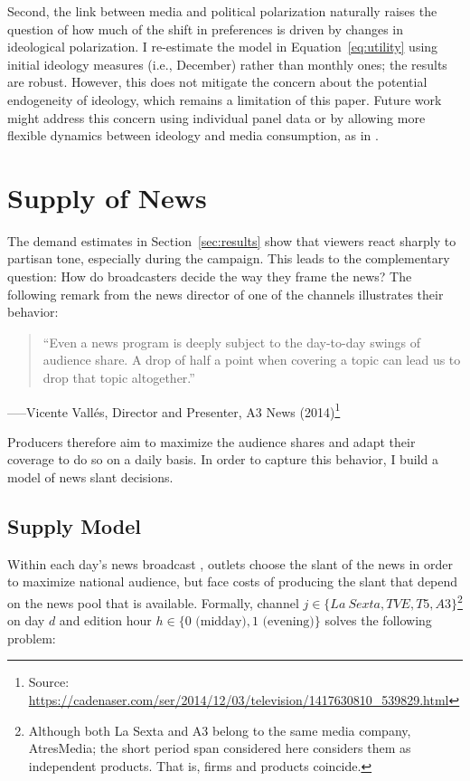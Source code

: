 \documentclass[12pt]{article}
\begin{document}
Second, the link between media and political polarization naturally raises the question of how much of the shift in preferences is driven by changes in ideological polarization. I re-estimate the model in Equation~\eqref{eq:utility} using initial ideology measures (i.e., December) rather than monthly ones; the results are robust. However, this does not mitigate the concern about the potential endogeneity of ideology, which remains a limitation of this paper. Future work might address this concern using individual panel data or by allowing more flexible dynamics between ideology and media consumption, as in \cite{martin2017}.

 



\section{Supply of News}


\label{sec:supply}



The demand estimates in Section~\ref{sec:results} show that viewers react sharply to
partisan tone, especially during the campaign.  This  leads to the complementary question:
How do broadcasters decide the way they frame the news? 
The following remark from the news director of one of the channels illustrates their behavior: 


\begin{quote}
	“Even a news program is deeply subject to the day-to-day swings of audience share.  
	A drop of half a point when covering a topic can lead us to drop that topic altogether.”
\end{quote}
\hspace*{\fill}–––Vicente Vallés, Director and Presenter, A3 News (2014)\footnote{Source: \url{https://cadenaser.com/ser/2014/12/03/television/1417630810_539829.html}}

Producers therefore aim to maximize the audience shares and adapt their coverage to do so on a daily basis. In order to capture this behavior, I build a model of news slant decisions.  

\subsection{Supply Model}

Within each day's news broadcast , outlets choose the slant of the news in order to maximize national audience, but face costs of producing the slant that depend on the news pool that is available.  Formally, channel $j\in \{La \ Sexta, TVE, T5, A3\}$\footnote{Although both La Sexta and A3 belong to the same media company, AtresMedia; the short period span considered here considers them as independent products. That is, firms and products coincide. } on day $d$ and edition hour $h\in\{0\text{ (midday)},1\text{ (evening)}\}$ solves the following problem:
\end{document}
